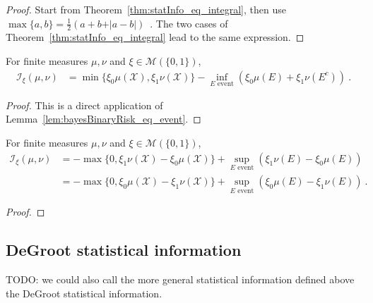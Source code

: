\begin{proof}%
{}
Start from Theorem~\ref{thm:statInfo_eq_integral}, then use $\max\{a,b\} = \frac{1}{2}\left( a + b + \vert a - b \vert \right)$~.
The two cases of Theorem~\ref{thm:statInfo_eq_integral} lead to the same expression.
\end{proof}


\begin{lemma}
  \label{lem:statInfo_eq_sub_inf_event}
  For finite measures $\mu, \nu$ and $\xi \in \mathcal M(\{0,1\})$,
  \begin{align*}
  \mathcal I_\xi(\mu, \nu)
  &= \min\{\xi_0 \mu(\mathcal X), \xi_1 \nu(\mathcal X)\} - \inf_{E \text{ event}} \left( \xi_0 \mu(E) + \xi_1 \nu(E^c) \right)
  \: .
  \end{align*}
\end{lemma}

\begin{proof}%
{}
This is a direct application of Lemma~\ref{lem:bayesBinaryRisk_eq_event}.
\end{proof}


\begin{lemma}
  \label{lem:statInfo_eq_sup_event}
  For finite measures $\mu, \nu$ and $\xi \in \mathcal M(\{0,1\})$,
  \begin{align*}
  \mathcal I_\xi(\mu, \nu)
  &= - \max\{0, \xi_1 \nu(\mathcal X) - \xi_0 \mu(\mathcal X) \} + \sup_{E \text{ event}} \left( \xi_1 \nu(E) - \xi_0 \mu(E) \right)
  \\
  &= - \max\{0, \xi_0 \mu(\mathcal X) - \xi_1 \nu(\mathcal X) \} + \sup_{E \text{ event}} \left( \xi_0 \mu(E) - \xi_1 \nu(E) \right)
  \: .
  \end{align*}
\end{lemma}

\begin{proof}%
{}

\end{proof}



\subsection{DeGroot statistical information}

TODO: we could also call the more general statistical information defined above the DeGroot statistical information.

